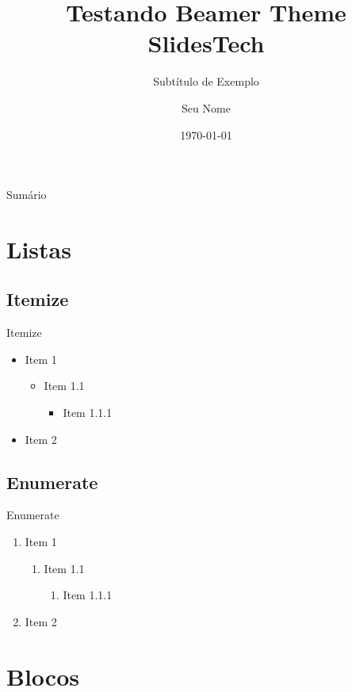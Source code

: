 \documentclass[aspectratio=169]{beamer}
\title[Testando SlidesTech]{Testando Beamer Theme SlidesTech}
\subtitle{Subtítulo de Exemplo}
\author{Seu Nome}
\institute{\textsc{impa} Tech}
\date{\today}
\begin{document}
\maketitle

\begin{frame}{Sumário}

\tableofcontents
    
\end{frame}

\section{Listas}

\subsection{Itemize}
\begin{frame}{Itemize}
\begin{itemize}
    \item Item 1
    \begin{itemize}
        \item Item 1.1
        \begin{itemize}
            \item Item 1.1.1
        \end{itemize}
    \end{itemize}
    \item Item 2
\end{itemize}
\end{frame}

\subsection{Enumerate}
\begin{frame}{Enumerate}
\begin{enumerate}
    \item Item 1
    \begin{enumerate}
        \item Item 1.1
        \begin{enumerate}
            \item Item 1.1.1
        \end{enumerate}
    \end{enumerate}
    \item Item 2
\end{enumerate}
\end{frame}

\section{Blocos}
\end{document}
